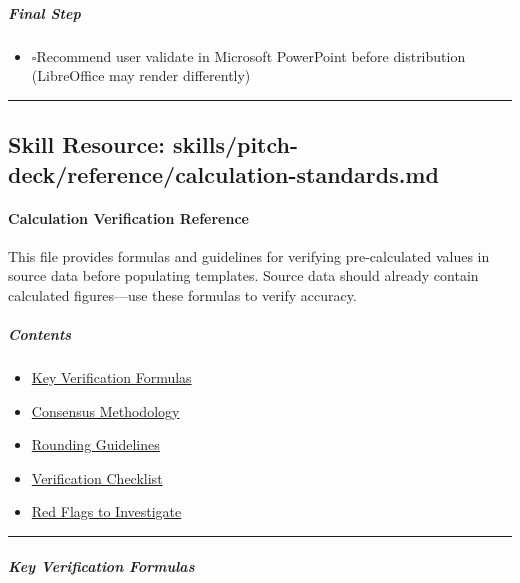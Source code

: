 \documentclass[11pt]{article}
\newcommand{\UncheckedBox}{$\square$}
\begin{document}
\subparagraph{Final Step}\mbox{}\par
\begin{itemize}[leftmargin=*,itemsep=2pt,topsep=2pt]
\item {} \UncheckedBox Recommend user validate in Microsoft PowerPoint before distribution (LibreOffice may render differently)
\end{itemize}

\vspace{0.8em}\hrule\vspace{0.8em}

\subsection{Skill Resource: skills/pitch-deck/reference/calculation-standards.md}\label{file:skills-pitch-deck-reference-calculation-standards.md}

\paragraph{Calculation Verification Reference}\mbox{}\par

This file provides formulas and guidelines for verifying pre-calculated values in source data before populating templates. Source data should already contain calculated figures—use these formulas to verify accuracy.


\subparagraph{Contents}\mbox{}\par

\begin{itemize}[leftmargin=*,itemsep=2pt,topsep=2pt]
\item {} \href{\#key-verification-formulas}{Key Verification Formulas}
\item {} \href{\#consensus-methodology}{Consensus Methodology}
\item {} \href{\#rounding-guidelines}{Rounding Guidelines}
\item {} \href{\#verification-checklist}{Verification Checklist}
\item {} \href{\#red-flags-to-investigate}{Red Flags to Investigate}
\end{itemize}

\vspace{0.5em}\hrule\vspace{0.5em}

\subparagraph{Key Verification Formulas}\mbox{}\par
\end{document}
